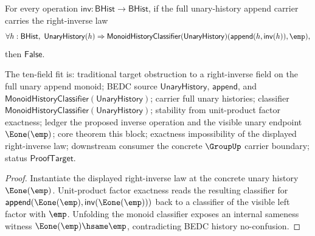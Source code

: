 \begin{theorem}
\label{thm:unary-append-monoid-right-inverse-law-absurd}
For every operation $\mathsf{inv}:\mathsf{BHist}\to\mathsf{BHist}$, if the
full unary-history append carrier carries the right-inverse law
$$
\forall h:\mathsf{BHist},\
\mathsf{UnaryHistory}(h)\Rightarrow
\mathsf{MonoidHistoryClassifier}(\mathsf{UnaryHistory})
(\mathsf{append}(h,\mathsf{inv}(h)),\emp),
$$
then $\mathsf{False}$.

The ten-field fit is: traditional target obstruction to a right-inverse field
on the full unary append monoid; BEDC source $\mathsf{UnaryHistory}$,
$\mathsf{append}$, and
$\mathsf{MonoidHistoryClassifier}(\mathsf{UnaryHistory})$; carrier full unary
histories; classifier $\mathsf{MonoidHistoryClassifier}(\mathsf{UnaryHistory})$;
stability from unit-product factor exactness; ledger the proposed inverse
operation and the visible unary endpoint $\Eone(\emp)$; core theorem this
block; exactness impossibility of the displayed right-inverse law; downstream
consumer the concrete $\GroupUp$ carrier boundary; status
$\mathsf{ProofTarget}$.
\end{theorem}
\begin{proof}
Instantiate the displayed right-inverse law at the concrete unary history
$\Eone(\emp)$. Unit-product factor exactness reads the resulting classifier for
$\mathsf{append}(\Eone(\emp),\mathsf{inv}(\Eone(\emp)))$ back to a classifier
of the visible left factor with $\emp$. Unfolding the monoid classifier exposes
an internal sameness witness $\Eone(\emp)\hsame\emp$, contradicting BEDC
history no-confusion.
\end{proof}

